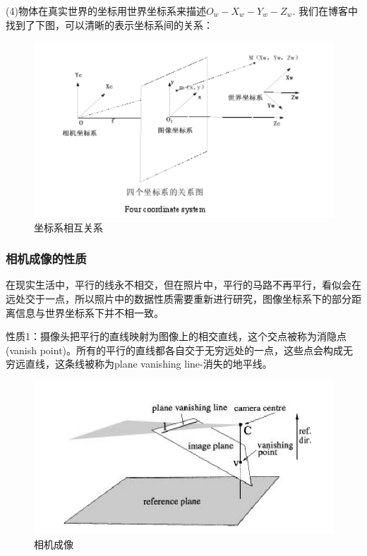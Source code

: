 (4)物体在真实世界的坐标用世界坐标系来描述$O_w-X_w-Y_w-Z_w$.
我们在博客中找到了下图，可以清晰的表示坐标系间的关系：

\begin{figure}[h]
    \centering
    \includegraphics[scale=1]{figures/坐标系相互关系.png}
    \caption{坐标系相互关系}
    \label{fig:p5}
\end{figure}

\subsubsection{相机成像的性质}

在现实生活中，平行的线永不相交，但在照片中，平行的马路不再平行，看似会在远处交于一点，所以照片中的数据性质需要重新进行研究，图像坐标系下的部分距离信息与世界坐标系下并不相一致。

性质1：摄像头把平行的直线映射为图像上的相交直线，这个交点被称为消隐点(vanish point)。所有的平行的直线都各自交于无穷远处的一点，这些点会构成无穷远直线，这条线被称为plane vanishing line-消失的地平线。

\begin{figure}[h]
    \centering
    \includegraphics[scale=1]{figures/相机成像.png}
    \caption{相机成像}
    \label{fig:p6}
\end{figure}

